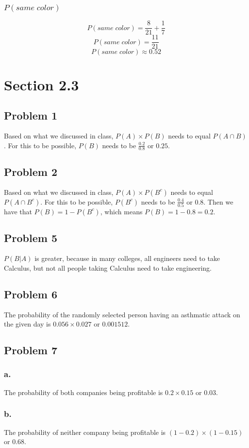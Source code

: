 \documentclass[11pt]{article}
\begin{document}
\subsubsection*{$P(same\;color)$}
\[P(same\;color) = \frac{8}{21} + \frac{1}{7}\]
\[P(same\;color) = \frac{11}{21}\]
\[P(same\;color) \approx 0.52 \]

\section*{Section 2.3}
\subsection*{Problem 1}
Based on what we discussed in class, $P(A)\times P(B)$ needs to equal 
$P(A \cap B)$. For this to be possible, $P(B)$ needs to be 
$\frac{0.2}{0.8}$ or $0.25$. 

\subsection*{Problem 2}
Based on what we discussed in class, $P(A) \times P(B^c)$ needs to equal 
$P(A \cap B^c)$. For this to be possible, $P(B^c)$ needs to be 
$\frac{0.4}{0.5}$ or $0.8$. Then we have that $P(B) = 1 - P(B^c)$, which
means $P(B) = 1 - 0.8 = 0.2$. 

\subsection*{Problem 5}
$P(B|A)$ is greater, because in many colleges, all engineers need to take
Calculus, but not all people taking Calculus need to take engineering. 

\subsection*{Problem 6}
The probability of the randomly selected person having an asthmatic attack on
the given day is $0.056 \times 0.027$ or $0.001512$. 

\subsection*{Problem 7}
\subsubsection*{a.}
The probability of both companies being profitable is $0.2 \times 0.15$ or
$0.03$.
\subsubsection*{b.}
The probability of neither company being profitable is 
$(1 - 0.2) \times (1 - 0.15)$ or $0.68$. 
\end{document}
